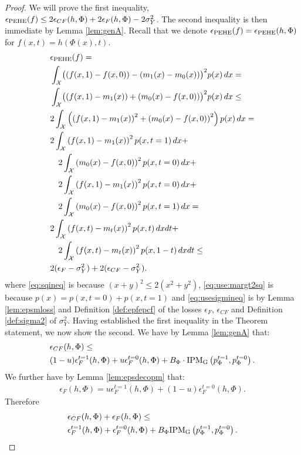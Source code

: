 \begin{proof}
We will prove the first inequality, $\epsilon_{\text{PEHE}}(f) \leq   2\epsilon_{CF}(h,\Phi) + 2\epsilon_F(h,\Phi) - 2\sigma^2_Y$. The second inequality is then immediate by Lemma \ref{lem:genA}.
Recall that we denote $\epsilon_{\text{PEHE}}(f) = \epsilon_{\text{PEHE}}(h,\Phi)$ for $f(x,t) = h(\Phi(x),t)$.
\begin{align}
&\epsilon_{\text{PEHE}}(f) = \nonumber\\
& \int_\mathcal X \bigl(\left(f(x,1) - f(x,0)\right) - \left(m_1(x) - m_0(x)\right) \bigr)^2 p(x) \, dx= \nonumber\\
& \int_\mathcal X \bigl( \left(f(x,1) - m_1(x)\right) + \left(m_0(x) - f(x,0)\right) \bigr)^2 p(x) \, dx \leq  \label{eq:sqineq}\\
&  2\int_\mathcal X \left(\left(  f(x,1) - m_1(x) \right)^2  + \left(m_0(x) - f(x,0) \right)^2\right) p(x) \, dx = \label{eq:use:margt2sq} \\
& 2\int_\mathcal X  \left(f(x,1) - m_1(x)\right)^2  p(x,t=1)  \,dx+ \nonumber \\
& \quad 2\int_\mathcal X \left(m_0(x) - f(x,0) \right)^2  p(x,t=0)  \, dx +  \nonumber\\
& \quad 2\int_\mathcal X  \left(f(x,1) - m_1(x)\right)^2 p(x,t=0)  \, dx+ \nonumber\\
& \quad 2\int_\mathcal X \left(m_0(x) - f(x,0) \right)^2  p(x,t=1)  \, dx \nonumber = \\
&2 \int_\mathcal X \left(f(x,t) - m_t(x)\right)^2 p(x,t) \, dx dt + \nonumber \\
&\quad 2 \int_\mathcal X \left(f(x,t) - m_t(x)\right)^2 p(x,1-t)\, dx dt \leq \label{eq:usesigmineq}\\
&2 (\epsilon_F - \sigma^2_Y) + 2 (\epsilon_{CF} - \sigma^2_Y). \nonumber
\end{align}
where \eqref{eq:sqineq} is because $(x+y)^2 \leq 2(x^2 + y^2)$, \eqref{eq:use:margt2sq} is because $p(x) = p(x,t=0) + p(x,t=1)$ and \eqref{eq:usesigmineq} is by Lemma \ref{lem:epsmloss} and Definition \ref{def:epfepcf} of the losses $\epsilon_F$, $\epsilon_{CF}$ and Definition \ref{def:sigma2} of $\sigma^2_Y$.
Having established the first inequality in the Theorem statement, we now show the second.
We have by Lemma \ref{lem:genA} that:
\begin{align*}
&\epsilon_{CF}(h,\Phi) \leq  \\ 
&(1-u)  \epsilon^{t=1}_F(h,\Phi) + u  \epsilon^{t=0}_F(h,\Phi) +   B_\Phi \cdot \text{IPM}_{\mathrm{G}}\left( p^{t=1}_\Phi, p^{t=0}_\Phi \right).
\end{align*}
We further have by Lemma \ref{lem:epsdecopm} that:
\begin{align*} 
\epsilon_F(h,\Phi) = u \epsilon^{t=1}_F(h,\Phi) + (1-u) \epsilon^{t=0}_F(h,\Phi).
\end{align*}
Therefore 
\begin{align*}
&\epsilon_{CF}(h,\Phi)+\epsilon_F(h,\Phi) \leq  \\
&\epsilon^{t=1}_F(h,\Phi) + \epsilon^{t=0}_F(h,\Phi)+ B_\Phi  \text{IPM}_{\mathrm{G}}\left( p^{t=1}_\Phi, p^{t=0}_\Phi \right).
\end{align*}
\end{proof}

